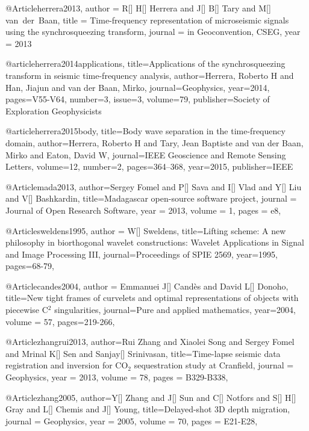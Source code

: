 @Article{herrera2013,
  author = 	 {R[] H[] Herrera and J[] B[] Tary and M[] van~der~Baan},
  title = 	 {Time-frequency representation of microseismic signals using the synchrosqueezing transform},
  journal = 	 {in Geoconvention, CSEG},
  year = 	 2013
}

@article{herrera2014applications,
  title={Applications of the synchrosqueezing transform in seismic time-frequency analysis},
  author={Herrera, Roberto H and Han, Jiajun and van der Baan, Mirko},
  journal={Geophysics},
  year={2014},
  pages={V55-V64},
  number=3,
  issue=3,
  volume=79,
  publisher={Society of Exploration Geophysicists}
}

@article{herrera2015body,
  title={Body wave separation in the time-frequency domain},
  author={Herrera, Roberto H and Tary, Jean Baptiste and van der Baan, Mirko and Eaton, David W},
  journal={IEEE Geoscience and Remote Sensing Letters},
  volume={12},
  number={2},
  pages={364--368},
  year={2015},
  publisher={IEEE}
}

@Article{mada2013,
  author={Sergey Fomel and P[] Sava and I[] Vlad and Y[] Liu and V[] Bashkardin},
  title={Madagascar open-source software project},
  journal = 	 {Journal of Open Research Software},
  year = 	 2013,
  volume =	 1,
  pages =	 {e8},
}

@Article{sweldens1995,
  author = {W[] Sweldens},
  title={Lifting scheme: A new philosophy in biorthogonal wavelet constructions: Wavelet Applications in Signal and Image Processing III},
  journal={Proceedings of SPIE 2569},
  year=1995,
  pages={68-79},
}

@Article{candes2004,
  author = {Emmanuei J[] Cand\`{e}s and David L[] Donoho},
  title={New tight frames of curvelets and optimal representations of objects with piecewise {C}$^2$ singularities},
  journal={Pure and applied mathematics},
  year=2004,
  volume =	 57,
  pages={219-266},
}


@Article{zhangrui2013,
  author={Rui Zhang and Xiaolei Song and Sergey Fomel and Mrinal K[] Sen and Sanjay[] Srinivasan},
  title={Time-lapse seismic data registration and inversion for {CO}$_2$ sequestration study at Cranfield},
  journal = 	 {Geophysics},
  year = 	 2013,
  volume =	 78,
  pages =	 {B329-B338},
}

@Article{zhang2005,
  author={Y[] Zhang and J[] Sun and C[] Notfors and S[] H[] Gray and L[] Chemis and J[] Young},
  title={Delayed-shot 3{D} depth migration},
  journal = 	 {Geophysics},
  year = 	 2005,
  volume =	 70,
  pages =	 {E21-E28},
}

